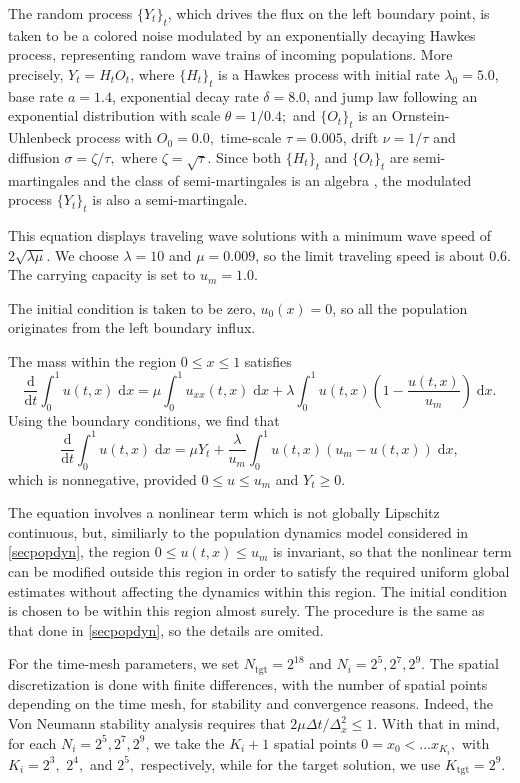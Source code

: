 \documentclass[reqno,12pt]{amsart}
\theoremstyle{plain} %
\theoremstyle{definition} %
\begin{document}
The random process $\{Y_t\}_t$, which drives the flux on the left boundary point, is taken to be a colored noise modulated by an exponentially decaying Hawkes process, representing random wave trains of incoming populations. More precisely, $Y_t = H_t O_t$, where $\{H_t\}_t$ is a Hawkes process with initial rate $\lambda_0 = 5.0$, base rate $a = 1.4$, exponential decay rate $\delta = 8.0$, and jump law following an exponential distribution with scale $\theta = 1/0.4;$ and $\{O_t\}_t$ is an Ornstein-Uhlenbeck process with $O_0 = 0.0,$ time-scale $\tau = 0.005$, drift $\nu = 1/\tau$ and diffusion $\sigma = \zeta/\tau,$ where $\zeta = \sqrt{\tau}.$ Since both $\{H_t\}_t$ and $\{O_t\}_t$ are semi-martingales and the class of semi-martingales is an algebra \cite[Corollary II.3]{Protter2005}, the modulated process $\{Y_t\}_t$ is also a semi-martingale.

This equation displays traveling wave solutions with a minimum wave speed of $2 \sqrt{\lambda \mu}$. We choose $\lambda = 10$ and $\mu= 0.009$, so the limit traveling speed is about $0.6$. The carrying capacity is set to $u_m = 1.0$.

The initial condition is taken to be zero, $u_0(x) = 0$, so all the population originates from the left boundary influx.

The mass within the region $0\leq x \leq 1$ satisfies
\[
   \frac{\mathrm{d}}{\mathrm{d} t} \int_0^1 u(t, x) \;\mathrm{d}x = \mu\int_0^1 u_{xx}(t, x) \;\mathrm{d}x + \lambda \int_0^1 u(t, x)\left(1 - \frac{u(t, x)}{u_m}\right)\;\mathrm{d}x.
\]
Using the boundary conditions, we find that
\[
   \frac{\mathrm{d}}{\mathrm{d}t} \int_0^1 u(t, x) \;\mathrm{d}x = \mu Y_t  + \frac{\lambda}{u_m} \int_0^1 u(t, x)\left(u_m - u(t, x)\right)\;\mathrm{d}x,
\]
which is nonnegative, provided $0 \leq u \leq u_m$ and $Y_t \geq 0$.

The equation involves a nonlinear term which is not globally Lipschitz continuous, but, similiarly to the population dynamics model considered in \cref{secpopdyn}, the region $0 \leq u(t, x) \leq u_m$ is invariant, so that the nonlinear term can be modified outside this region in order to satisfy the required uniform global estimates without affecting the dynamics within this region. The initial condition is chosen to be within this region almost surely. The procedure is the same as that done in \cref{secpopdyn}, so the details are omited.

For the time-mesh parameters, we set $N_{\textrm{tgt}} = 2^{18}$ and $N_i = 2^5, 2^7, 2^9.$ The spatial discretization is done with finite differences, with the number of spatial points depending on the time mesh, for stability and convergence reasons. Indeed, the Von Neumann stability analysis requires that $2\mu\Delta t / \Delta_x^2 \leq 1.$ With that in mind, for each $N_i = 2^5, 2^7, 2^9$, we take the $K_i + 1$ spatial points $0 = x_0 < \ldots x_{K_i},$ with $K_i = 2^3,$ $2^4,$ and $2^5,$ respectively, while for the target solution, we use $K_{\textrm{tgt}} = 2^9.$
\end{document}
